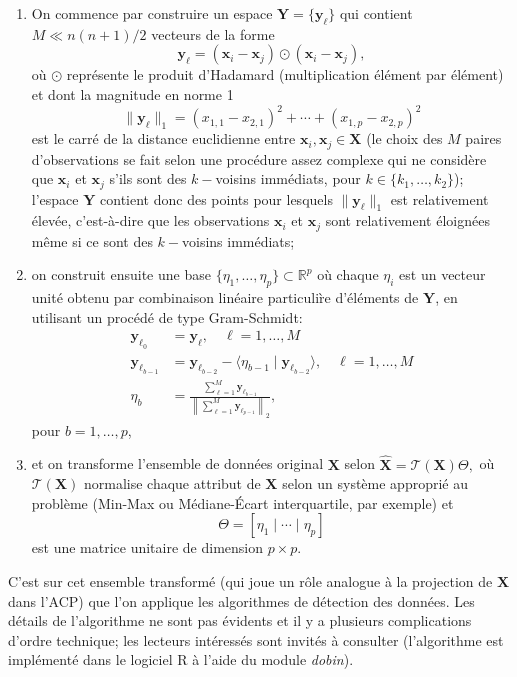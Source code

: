 \begin{enumerate}[noitemsep] 
\item On commence par construire  un espace $\mathbf{Y}=\{\mathbf{y}_{\ell}\}$  qui contient $M\ll n(n+1)/2$  vecteurs de la forme $$\mathbf{y}_{\ell}=(\mathbf{x}_i -\mathbf{x}_j)\odot (\mathbf{x}_i -\mathbf{x}_j), $$ o\`u $\odot$ repr\'esente le produit d'Hadamard (multiplication \'el\'ement par \'el\'ement) et dont la magnitude en norme 1 $$\|\mathbf{y}_{\ell}\|_1=(x_{1,1}-x_{2,1})^2+\cdots +(x_{1,p}-x_{2,p})^2 $$ est le carr\'e de la distance euclidienne entre $\mathbf{x}_i,\mathbf{x}_j \in\mathbf{X}$ (le choix des $M$ paires d'observations se fait selon une proc\'edure assez complexe qui ne consid\`ere que $\mathbf{x}_i$ et $\mathbf{x}_j$ s'ils sont des $k-$voisins imm\'ediats, pour $k\in\{k_1,\ldots, k_2\}$); l'espace $\mathbf{Y}$ contient donc des points pour lesquels $\|\mathbf{y}_{\ell}\|_1$ est relativement \'elev\'ee, c'est-\`a-dire que les observations $\mathbf{x}_i$ et $\mathbf{x}_j$ sont relativement \'eloign\'ees m\^eme si ce sont des $k-$voisins imm\'ediats;
\item on construit ensuite une base $\{\eta_1,\ldots,\eta_p\}\subset \mathbb{R}^p$ o\`u chaque $\eta_i$ est un vecteur unit\'e obtenu par combinaison lin\'eaire particuli\`re d'\'el\'ements de $\mathbf{Y}$, en utilisant un proc\'ed\'e de type Gram-Schmidt: 
\begin{align*}
\mathbf{y}_{\ell_0}&=\mathbf{y}_{\ell},\quad \ell=1,\ldots, M \\ 
\mathbf{y}_{\ell_{b-1}}&=\mathbf{y}_{\ell_{b-2}}-\langle\eta_{b-1} \mid \mathbf{y}_{\ell_{b-2}}\rangle,\quad \ell=1,\ldots, M \\ 
\eta_b&=\frac{\sum_{\ell=1}^M\mathbf{y}_{\ell_{b-1}}}{\left\|\sum_{\ell=1}^M\mathbf{y}_{\ell_{p-1}}\right\|_2},
\end{align*} pour $b=1,\ldots,p$,
\item et on transforme l'ensemble de donn\'ees original  $\mathbf{X}$ selon $\hat{\mathbf{X}}=\mathcal{T}(\mathbf{X})\Theta,$ o\`u $\mathcal{T}(\mathbf{X})$ normalise chaque attribut de $\mathbf{X}$ selon un syst\`eme appropri\'e au probl\`eme (Min-Max ou M\'ediane-\'Ecart interquartile, par exemple) et $$\Theta=[\eta_1\mid\cdots\mid \eta_p]$$ est une matrice unitaire de dimension $p\times p$.  
\end{enumerate}
C'est sur cet ensemble transform\'e (qui joue un r\^ole analogue \`a la projection de $\mathbf{X}$ dans l'ACP) que l'on applique les algorithmes de d\'etection des donn\'ees.\newl 
Les d\'etails de l'algorithme ne sont pas \'evidents et il y a plusieurs complications d'ordre technique; les lecteurs int\'eress\'es sont invit\'es \`a consulter \cite{A6} (l'algorithme est impl\'ement\'e dans le logiciel R \`a l'aide du module \textit{dobin}). 
%
